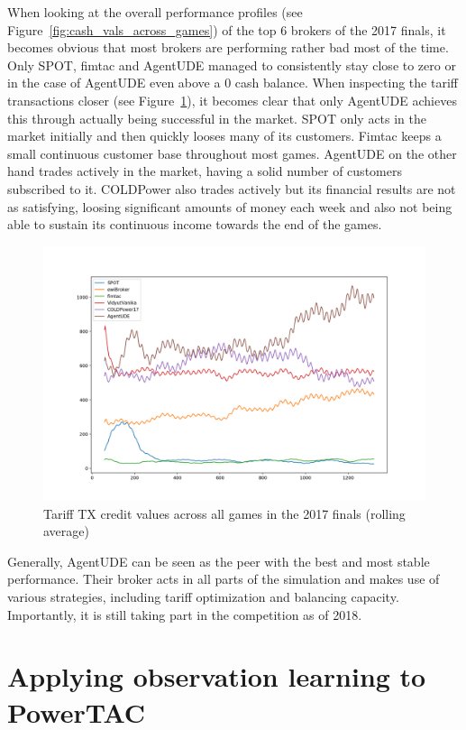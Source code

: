 When looking at the overall performance profiles (see Figure~\ref{fig:cash_vals_across_games}) of the top 6 brokers of
the 2017 finals, it becomes obvious that most brokers are performing rather bad most of the time. Only SPOT, fimtac and
AgentUDE managed to consistently stay close to zero or in the case of AgentUDE even above a 0 cash balance. When
inspecting the tariff transactions closer (see Figure~\ref{fig:allttxucline}), it becomes clear that only AgentUDE
achieves this through actually being successful in the market. SPOT only acts in the market initially and then quickly
looses many of its customers. Fimtac keeps a small continuous customer base throughout most games. AgentUDE on the other
hand trades actively in the market, having a solid number of customers subscribed to it.  COLDPower also trades actively
but its financial results are not as satisfying, loosing significant amounts of money each week and also not being able
to sustain its continuous income towards the end of the games.
\begin{figure}[]
    \centering
    \includegraphics[width=1.0\linewidth]{img/all-ttx-uc-line.png}
    \caption{Tariff TX credit values across all games in the 2017 finals (rolling average)}
    \label{fig:allttxucline}
\end{figure}

Generally, AgentUDE can be seen as the peer with the best and most stable performance. Their broker acts in all
parts of the simulation and makes use of various strategies, including tariff optimization and balancing capacity.
Importantly, it is still taking part in the competition as of 2018.

\section{Applying observation learning to PowerTAC}%
\label{sub:applying_observation_learning_to_powertac}

